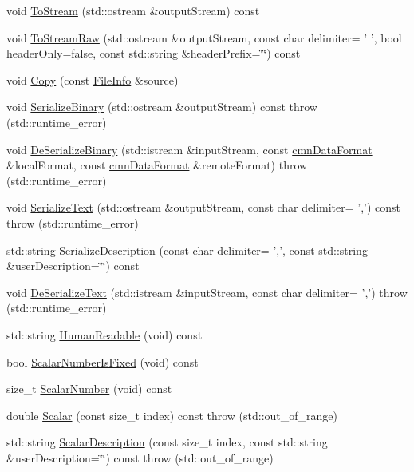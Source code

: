 \begin{DoxyCompactItemize}
void \hyperlink{classsvl_filter_source_text_file_types_1_1_file_info_a74c475c29ecd42ea46fc55573ffb888d}{To\-Stream} (std\-::ostream \&output\-Stream) const 
\item 
void \hyperlink{classsvl_filter_source_text_file_types_1_1_file_info_a7bd65d4afd72c9a162758856e66ac8b3}{To\-Stream\-Raw} (std\-::ostream \&output\-Stream, const char delimiter= ' ', bool header\-Only=false, const std\-::string \&header\-Prefix=\char`\"{}\char`\"{}) const 
\item 
void \hyperlink{classsvl_filter_source_text_file_types_1_1_file_info_a594b2dfddb6e172796a0e2141145ca3f}{Copy} (const \hyperlink{classsvl_filter_source_text_file_types_1_1_file_info}{File\-Info} \&source)
\item 
void \hyperlink{classsvl_filter_source_text_file_types_1_1_file_info_a6f38186e88fcb9cb7cc8d29e99177ff8}{Serialize\-Binary} (std\-::ostream \&output\-Stream) const   throw (std\-::runtime\-\_\-error)
\item 
void \hyperlink{classsvl_filter_source_text_file_types_1_1_file_info_aef7bce372a0de8b80258d84a84639e66}{De\-Serialize\-Binary} (std\-::istream \&input\-Stream, const \hyperlink{classcmn_data_format}{cmn\-Data\-Format} \&local\-Format, const \hyperlink{classcmn_data_format}{cmn\-Data\-Format} \&remote\-Format)  throw (std\-::runtime\-\_\-error)
\item 
void \hyperlink{classsvl_filter_source_text_file_types_1_1_file_info_ab9908fda5a000fa5bc53c619fa966695}{Serialize\-Text} (std\-::ostream \&output\-Stream, const char delimiter= ',') const   throw (std\-::runtime\-\_\-error)
\item 
std\-::string \hyperlink{classsvl_filter_source_text_file_types_1_1_file_info_aa8446c293a0cef1fb2d2174c35485fb4}{Serialize\-Description} (const char delimiter= ',', const std\-::string \&user\-Description=\char`\"{}\char`\"{}) const 
\item 
void \hyperlink{classsvl_filter_source_text_file_types_1_1_file_info_acb7c244072a4733f4ac0f008f621b33e}{De\-Serialize\-Text} (std\-::istream \&input\-Stream, const char delimiter= ',')  throw (std\-::runtime\-\_\-error)
\item 
std\-::string \hyperlink{classsvl_filter_source_text_file_types_1_1_file_info_a558114c36915e0f533c1d170f02e3ecc}{Human\-Readable} (void) const 
\item 
bool \hyperlink{classsvl_filter_source_text_file_types_1_1_file_info_a35ac02eb4f0e7522b03ae6bba0dda347}{Scalar\-Number\-Is\-Fixed} (void) const 
\item 
size\-\_\-t \hyperlink{classsvl_filter_source_text_file_types_1_1_file_info_a2b1f2da8026d6544841f211e17a11817}{Scalar\-Number} (void) const 
\item 
double \hyperlink{classsvl_filter_source_text_file_types_1_1_file_info_a8155daef33c8fda48f12dc715e73df7d}{Scalar} (const size\-\_\-t index) const   throw (std\-::out\-\_\-of\-\_\-range)
\item 
std\-::string \hyperlink{classsvl_filter_source_text_file_types_1_1_file_info_a5f0b3f7e2da4f476ff963a90e3eb537a}{Scalar\-Description} (const size\-\_\-t index, const std\-::string \&user\-Description=\char`\"{}\char`\"{}) const   throw (std\-::out\-\_\-of\-\_\-range)
\end{DoxyCompactItemize}
